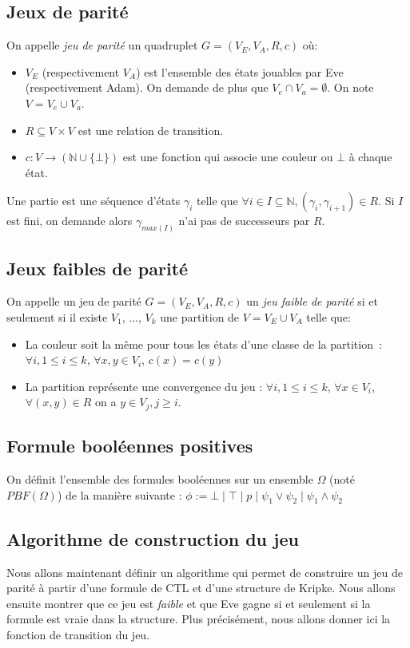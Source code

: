 \documentclass[10pt,a4paper]{article}
\begin{document}
\subsection{Jeux de parité}
On appelle \emph{jeu de parité} un quadruplet $G = (V_E, V_A, R, c)$ où:
\begin{itemize}
\item $V_E$ (respectivement $V_A$) est l'ensemble des états jouables par Eve (respectivement Adam). On demande de plus que $V_e \cap V_a = \emptyset$. On note $V = V_e \cup V_a$.
\item $R \subseteq V \times V$ est une relation de transition.
\item $c : V \to (\mathbb{N} \cup \{\bot\})$ est une fonction qui associe une couleur ou $\bot$ à chaque état.
\end{itemize}

Une partie est une séquence d'états $\gamma_i$ telle que $\forall i \in I \subseteq \mathbb{N}, (\gamma_i,\gamma_{i+1}) \in R$. Si $I$ est fini, on demande alors $\gamma_{max(I)}$ n'ai pas de successeurs par $R$.

\subsection{Jeux faibles de parité}

On appelle un jeu de parité $G = (V_E,V_A,R,c)$ un \emph{jeu faible de parité}  si et seulement si il existe $V_1$, ..., $V_k$ une partition de $V = V_E \cup V_A$ telle que:
\begin{itemize}
\item La couleur soit la même pour tous les états d'une classe de la partition : $\forall i, 1 \leq i \leq k$, $\forall x, y \in V_i$, $c(x) = c(y)$
\item La partition représente une convergence du jeu :
$\forall i, 1 \leq i \leq k$, $ \forall x \in V_i$, $\forall (x,y) \in R$ on a $ y \in V_j, j \geq i$.
\end{itemize}

\subsection{Formule booléennes positives}
On définit l'ensemble des formules booléennes sur un ensemble $\Omega$ (noté $PBF(\Omega) $) de la manière suivante :
$\phi := \bot \mid \top \mid p \mid \psi_1 \lor \psi_2 \mid  \psi_1 \land \psi_2$

\subsection{Algorithme de construction du jeu}
Nous allons maintenant définir un algorithme qui permet de construire un jeu de parité à partir d'une formule de CTL et d'une structure de Kripke. Nous allons ensuite montrer que ce jeu est \emph{faible} et que Eve gagne si et seulement si la formule est vraie dans la structure. Plus précisément, nous allons donner ici la fonction de transition du jeu.
\end{document}
